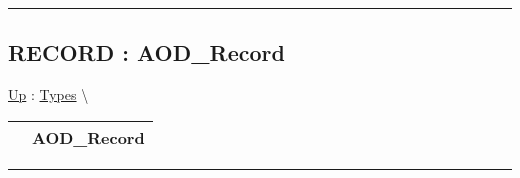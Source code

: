 \par


\rule{\linewidth}{0.5pt}
\subsection*{RECORD : AOD\_Record}
\hypertarget{ecldoc:logisticregression.types.aod_record}{}
\hyperlink{ecldoc:LogisticRegression.Types}{Up} :
\hspace{0pt} \hyperlink{ecldoc:LogisticRegression.Types}{Types} \textbackslash 

{\renewcommand{\arraystretch}{1.5}
\begin{tabularx}{\textwidth}{|>{\raggedright\arraybackslash}l|X|}
\hline
\hspace{0pt} & AOD\_Record \\
\hline
\end{tabularx}
}

\par


\rule{\linewidth}{0.5pt}


